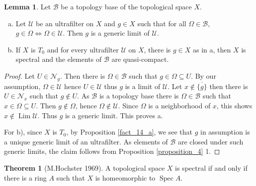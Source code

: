 \documentclass[10pt]{article}
\numberwithin{equation}{section}
\theoremstyle{definition}
\newtheorem{theorem}{Theorem} [subsection]
\newtheorem{lemma}{Lemma}[subsection]
\DeclareMathOperator{\Spec}{Spec}
\DeclareMathOperator{\Lim}{Lim}
\newcommand{\U}[0]{\mathcal{U}}
\newcommand{\B}[0]{\mathcal{B}}
\newcommand{\Nfil}[0]{\mathcal{N}}
\begin{document}
\begin{lemma}
    \label{lemma_1}
    Let $\mathcal{B}$ be a topology base of the topological space $X$.
    \begin{enumerate}[a.]
        \item Let $\U$ be an ultrafilter on $X$ and $g\in X$ such that for all $\Omega\in\mathcal{B}$, $g\in\Omega \Leftrightarrow\Omega\in\U$. Then $g$ is a generic limit of $\U$.
        \item If $X$ is $T_0$ and for every ultrafilter $\U$ on $X$, there is $g\in X$ as in a, then $X$ is spectral and the elements of $\B$ are quasi-compact.
    \end{enumerate}
\end{lemma}
\begin{proof}
    Let $U\in\Nfil_g$. Then there is $\Omega\in \B$ such that $g\in\Omega\subseteq U$. By our assumption, $\Omega\in\U$ hence $U\in\U$ thus $g$ is a limit of $\U$.
    Let $x\not\in\overline{\{g\}}$ then there is $U\in\Nfil_x$ such that $g\not\in U$. As $\B$ is a topology base there is $\Omega\in\B$ such that $x\in\Omega\subseteq U$. Then $g\not\in \Omega$, hence $\Omega\not\in\U$. Since $\Omega$ is a neighborhood of $x$, this shows $x\not\in\Lim\U$. Thus $g$ is a generic limit. This proves a.
    \par For b), since $X$ is $T_0$, by Proposition \ref{fact_14_a}, we see that $g$ in assumption is a unique generic limit of an ultrafilter.  As elements of $\B$ are closed under such generic limits, the claim follows from Proposition \ref{proposition_4} 1.
\end{proof}

\begin{theorem}[M.Hochster 1969]
    \label{theorem_1}
    A topological space $X$ is spectral if and only if there is a ring $A$ such that $X$ is homeomorphic to $\Spec A$.
\end{theorem}
\end{document}
